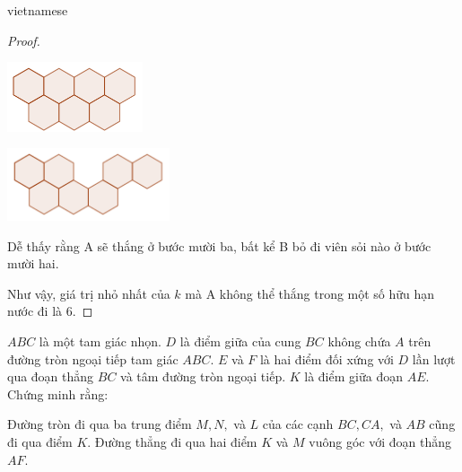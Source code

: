 \documentclass{article}
\begin{document}
\begin{otherlanguage*}{vietnamese}
\begin{proof}
    \begin{center}
        \centering
        \begin{minipage}[t]{4cm}
            \begin{center}
                \includegraphics[width=4cm]{./svg/pdf/pi-2024-1-p3-11a.pdf}
            \end{center}
        \end{minipage}
        \qquad
        \begin{minipage}[t]{4.8cm}
            \begin{center}
                \includegraphics[width=4.8cm]{./svg/pdf/pi-2024-1-p3-11b.pdf}
            \end{center}
        \end{minipage}
    \end{center}

    Dễ thấy rằng A sẽ thắng ở bước mười ba, bất kể B bỏ đi viên sỏi nào ở bước mười hai.

    Như vậy, giá trị nhỏ nhất của $k$ mà A không thể thắng trong một số hữu hạn nước đi là $\boxed{6.}$
\end{proof}

\newpage

\begin{example*}[Bài 4]
    $ABC$ là một tam giác nhọn. $D$ là điểm giữa của cung $BC$ không chứa $A$ trên đường tròn ngoại tiếp tam giác $ABC.$
    $E$ và $F$ là hai điểm đối xứng với $D$ lần lượt qua đoạn thẳng $BC$ và tâm đường tròn ngoại tiếp.
    $K$ là điểm giữa đoạn $AE.$ Chứng minh rằng:
    \begin{itemize}[topsep=0pt, partopsep=0pt, itemsep=0pt]
        \ii Đường tròn đi qua ba trung điểm $M, N,$ và $L$ của các cạnh $BC, CA,$ và $AB$ cũng đi qua điểm $K.$
        \ii Đường thẳng đi qua hai điểm $K$ và $M$ vuông góc với đoạn thẳng $AF.$
    \end{itemize} 
\end{example*}


\end{otherlanguage*}
\end{document}
